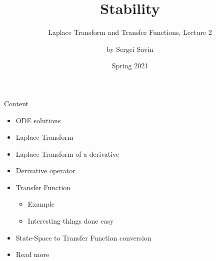 \documentclass{beamer}
\title{Stability}
\subtitle{ Laplace Transform and Transfer Functions, Lecture 2}
\author{by Sergei Savin}
\date{Spring 2021}
\begin{document}
\maketitle


\begin{frame}{Content}

\begin{itemize}
\item ODE solutions
\item Laplace Transform
\item Laplace Transform of a derivative
\item Derivative operator
\item Transfer Function
    \begin{itemize}
    \item Example
    \item Interesting things done easy
    \end{itemize}
\item State-Space to Transfer Function conversion
\item Read more
\end{itemize}

\end{frame}
\end{document}
